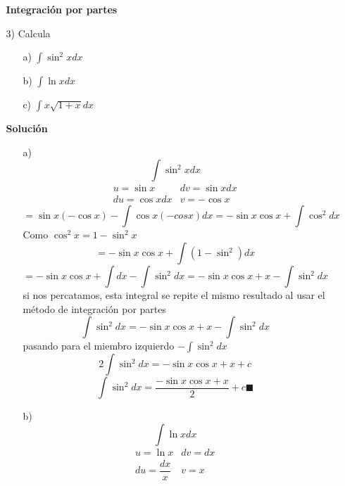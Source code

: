 \documentclass[10pt,twoside]{SelfArx} %
\begin{document}
\begin{enumerate}
\begin{enumerate}
\textbf{Integración por partes}\\
\item [3)]Calcula
\begin{enumerate}
	\item[a)] $ \displaystyle\int \sin^{2} xdx $
	\item[b)] $ \displaystyle\int\ln xdx $
	\item[c)] $ \displaystyle\int x\sqrt{1+x}dx $
\end{enumerate}
\textbf{Solución}\\
\begin{enumerate}
	\item[a)] \begin{equation}
	\displaystyle\int \sin^{2} xdx
	\end{equation}
	\[ \begin{array}{cc}
	u=\sin x & dv=\sin xdx\\
	du =\cos x dx & v=-\cos x
	\end{array} \]
	\begin{equation}
	=\sin x(-\cos x)-\int \cos x(-cos x)dx=-\sin x\cos x+\int \cos^{2}dx
	\end{equation}
	Como $ \cos^{2}x=1-\sin^{2} x $
	\begin{equation}
	=-\sin x\cos x+\int (1-\sin^{2})dx
	\end{equation}
	\begin{equation}
	=-\sin x\cos x+\int dx-\int\sin^{2}dx	=-\sin x\cos x+x-\int\sin^{2}dx
	\end{equation}
	si nos percatamos, esta integral se repite el mismo resultado al usar el método de integración por partes
	\begin{equation}
	\int\sin^{2}dx=-\sin x\cos x+x-\int\sin^{2}dx
	\end{equation}
	pasando para el miembro izquierdo $ -\int\sin^{2}dx $
	\begin{equation}
	2\int\sin^{2}dx=-\sin x\cos x+x+c
	\end{equation}
	\begin{equation}
	\int\sin^{2}dx=\dfrac{-\sin x\cos x+x}{2}+c\blacksquare
	\end{equation}
	 \item[b)] \begin{equation}
	  \displaystyle\int\ln xdx
	 \end{equation}	
	 \[ \begin{array}{cc}
	 u=\ln x & dv=dx\\
	 du=\dfrac{dx}{x} & v=x
	 \end{array} \]

\end{enumerate}
\end{enumerate}
\end{enumerate}
\end{document}
